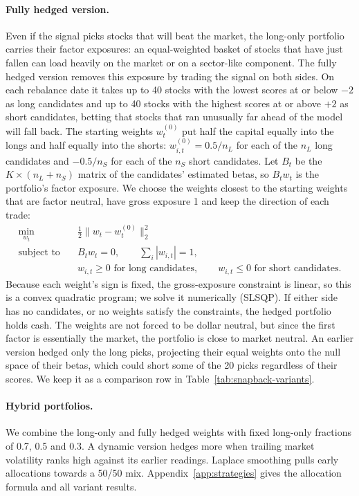 \documentclass[11pt,letterpaper]{article}
\begin{document}
\paragraph{Fully hedged version.} Even if the signal picks stocks that will beat the market,
the long-only portfolio carries their factor exposures: an equal-weighted basket of stocks
that have just fallen can load heavily on the market or on a sector-like component. The
fully hedged version removes this exposure by trading the signal on both sides. On each
rebalance date it takes up to 40 stocks with the lowest scores at or below $-2$ as long
candidates and up to 40 stocks with the highest scores at or above $+2$ as short candidates,
betting that stocks that ran unusually far ahead of the model will fall back. The starting
weights $w^{(0)}_t$ put half the capital equally into the longs and half equally into the
shorts: $w^{(0)}_{i,t} = 0.5 / n_L$ for each of the $n_L$ long candidates and $-0.5 / n_S$
for each of the $n_S$ short candidates. Let $B_t$ be the $K \times (n_L + n_S)$ matrix of
the candidates' estimated betas, so $B_t w_t$ is the portfolio's factor exposure. We choose
the weights closest to the starting weights that are factor neutral, have gross exposure 1
and keep the direction of each trade:
\[
    \begin{aligned}
        \min_{w_t} \quad & \tfrac{1}{2} \lVert w_t - w^{(0)}_t \rVert_2^2 \\
        \text{subject to} \quad & B_t w_t = 0, \qquad \textstyle\sum_i |w_{i,t}| = 1, \\
        & w_{i,t} \ge 0 \text{ for long candidates}, \qquad w_{i,t} \le 0 \text{ for short candidates}.
    \end{aligned}
\]
Because each weight's sign is fixed, the gross-exposure constraint is linear, so this is a
convex quadratic program; we solve it numerically (SLSQP). If either side has no candidates,
or no weights satisfy the constraints, the hedged portfolio holds cash. The weights are not
forced to be dollar neutral, but since the first factor is essentially the market, the
portfolio is close to market neutral. An earlier version hedged only the long picks,
projecting their equal weights onto the null space of their betas, which could short some of
the 20 picks regardless of their scores. We keep it as a comparison row in
Table~\ref{tab:snapback-variants}.

\paragraph{Hybrid portfolios.} We combine the long-only and fully hedged weights with fixed
long-only fractions of 0.7, 0.5 and 0.3. A dynamic version hedges more when trailing market
volatility ranks high against its earlier readings. Laplace smoothing pulls early
allocations towards a 50/50 mix. Appendix~\ref{app:strategies} gives the allocation formula
and all variant results.
\end{document}
